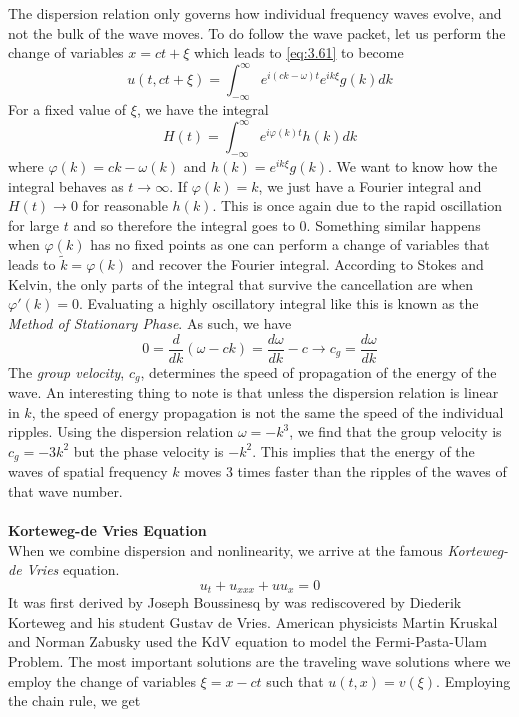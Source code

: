 \documentclass{article}
\newcommand{\od}[2]{\frac{d #1}{d #2}}
\numberwithin{equation}{section}
\begin{document}
The dispersion relation only governs how individual frequency waves evolve, and not the bulk of the wave moves. To do follow the wave packet, let us perform the change of variables $x=ct+\xi$ which leads to \eqref{eq:3.61} to become 
\begin{equation}
    u(t,ct +\xi) =\int^\infty_{-\infty} e^{i(ck-\omega)t}e^{ik\xi}g(k) dk
\end{equation}
For a fixed value of $\xi$, we have the integral 
\begin{equation}
    H(t) = \int^\infty_{-\infty} e^{i\varphi (k)t}h(k)dk
\end{equation}
where $\varphi(k) =ck-\omega(k)$ and $h(k) =e^{ik\xi}g(k)$. We want to know how the integral behaves as $t\rightarrow \infty$. If $\varphi(k) =k$, we just have a Fourier integral and $H(t)\rightarrow0$ for reasonable $h(k)$. This is once again due to the rapid oscillation for large $t$ and so therefore the integral goes to 0. Something similar happens when $\varphi(k)$ has no fixed points as one can perform a change of variables that leads to $\tilde{k} =\varphi(k)$ and recover the Fourier integral. According to Stokes and Kelvin, the only parts of the integral that survive the cancellation are when $\varphi'(k) =0$. Evaluating a highly oscillatory integral like this is known as the \textit{Method of Stationary Phase}. As such, we have 
\begin{equation}
    0 =\od{}{k}(\omega-ck) =\od{\omega}{k} -c \rightarrow c_g=\od{\omega}{k}
\end{equation}
The \textit{group velocity}, $c_g$, determines the speed of propagation of the energy of the wave. An interesting thing to note is that unless the dispersion relation is linear in $k$, the speed of energy propagation is not the same the speed of the individual ripples. Using the dispersion relation $\omega = -k^3$, we find that the group velocity is $c_g =-3k^2$ but the phase velocity is $-k^2$. This implies that the energy of the waves of spatial frequency $k$ moves 3 times faster than the ripples of the waves of that wave number. \\\\
\textbf{Korteweg-de Vries Equation}\\
When we combine dispersion and nonlinearity, we arrive at the famous \textit{Korteweg-de Vries} equation.
\begin{equation}
    u_t+u_{xxx}+uu_x=0
\end{equation}
It was first derived by Joseph Boussinesq by was rediscovered by Diederik Korteweg and his student Gustav de Vries. American physicists Martin Kruskal and Norman Zabusky used the KdV equation to model the Fermi-Pasta-Ulam Problem. The most important solutions are the traveling wave solutions where we employ the change of variables $\xi =x-ct$ such that $u(t,x)=v(\xi)$. Employing the chain rule, we get 
\end{document}
